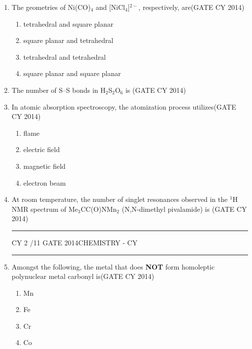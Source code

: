 \documentclass[a4paper,10pt]{exam}
\theoremstyle{remark}
\begin{document}
\begin{enumerate}
    \item The geometries of Ni(CO)$_4$ and [NiCl$_4$]$^{2-}$, respectively, are\hfill{(GATE CY 2014)}
    \begin{multicols}{2}
    \begin{enumerate} 
        \item tetrahedral and square planar
        \item square planar and tetrahedral
        \item tetrahedral and tetrahedral
        \item square planar and square planar
    \end{enumerate}
    \end{multicols}

    \item The number of S–S bonds in H$_2$S$_2$O$_6$ is \underline{\hspace{2cm}}\hfill{(GATE CY 2014)}

    \item In atomic absorption spectroscopy, the atomization process utilizes\hfill{(GATE CY 2014)}
    \begin{multicols}{4}
    \begin{enumerate} 
        \item flame
        \item electric field
        \item magnetic field
        \item electron beam
    \end{enumerate}
    \end{multicols}

    \item At room temperature, the number of singlet resonances observed in the $^{1}$H NMR spectrum of Me$_3$CC(O)NMn$_2$ (N,N-dimethyl pivalamide) is \underline{\hspace{2cm}}\hfill{(GATE CY 2014)}
\vfill
\noindent\rule{\linewidth}{0.4pt}
CY \hfill 2 /11
\newpage
GATE 2014\hfill CHEMISTRY - CY\\
\noindent\rule{\linewidth}{0.4pt}

\item Amongst the following, the metal that does \textbf{NOT} form homoleptic polynuclear metal carbonyl is\hfill{(GATE CY 2014)}
    \begin{multicols}{4}
    \begin{enumerate} 
        \item Mn
        \item Fe
        \item Cr
        \item Co
    \end{enumerate}
    \end{multicols}


\end{enumerate}
\end{document}
